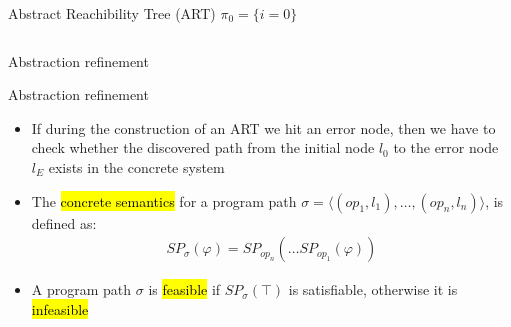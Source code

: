 
\begin{frame}{Abstract Reachibility Tree (ART)}
$\pi_0 = \{ i = 0\}$
\begin{columns}
  \begin{column}{0.5\textwidth}   
    
  \end{column}  
  \begin{column}{0.5\textwidth}
    
  \end{column}
  
\end{columns}
\end{frame}


\begin{frame}{Abstraction refinement}
\resizebox{1.05\textwidth}{!}{
  
}
\end{frame}


\begin{frame}{Abstraction refinement}
\begin{itemize}
  \itemsep 1em 
  \item If during the construction of an ART we hit an error node, then we have
  to check whether the discovered path from the initial node $l_0$ to the error
  node $l_E$ exists in the concrete system
  
  \item The \hl{concrete semantics} for a program path 
  $\sigma = \langle (op_1, l_1), \ldots, (op_n, l_n) \rangle$, is defined as:
    \begin{align*}
      SP_\sigma(\varphi) = SP_{op_n}(\ldots SP_{op_1}(\varphi))
    \end{align*}
  
  \item A program path $\sigma$ is \hl{feasible} if $SP_\sigma(\top)$ is
  satisfiable, otherwise it is \hl{infeasible}
\end{itemize}
\end{frame}


